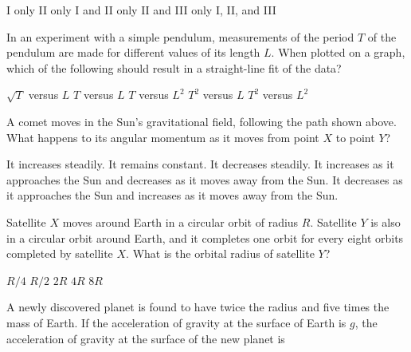 \documentclass[12pt]{../../oss-classkick-exam}
\begin{document}
\begin{questions}
  \begin{oneparchoices}
    \choice I only
    \choice II only
    \choice I and II only
    \choice II and III only
    \choice I, II, and III
  \end{oneparchoices}
  \vspace{.3in}
  
  \question In an experiment with a simple pendulum, measurements of the period
  $T$ of the pendulum are made for different values of its length $L$.
  When plotted on a graph, which of the following should result in a
  straight-line fit of the data?

  \begin{oneparchoices}
    \choice $\sqrt{T}$ versus $L$
    \choice $T$ versus $L$
    \choice $T$ versus $L^2$
    \choice $T^2$ versus $L$
    \choice $T^2$ versus $L^2$
  \end{oneparchoices}
  \vspace{.3in}
  \newpage
  
  \begin{center}
    \vspace{-.3in} 
  \end{center}
  \question A comet moves in the Sun's gravitational field, following the path
  shown above. What happens to its angular momentum as it moves from point $X$
  to point $Y$?
  \begin{choices}
    \choice It increases steadily.
    \choice It remains constant.
    \choice It decreases steadily.
    \choice It increases as it approaches the Sun and decreases as it moves
    away from the Sun.
    \choice It decreases as it approaches the Sun and increases as it moves
    away from the Sun.
  \end{choices}
  \vspace{.7in}

  \question Satellite $X$ moves around Earth in a circular orbit of radius $R$.
  Satellite $Y$ is also in a circular orbit around Earth, and it completes one
  orbit for every eight orbits completed by satellite $X$. What is the
  orbital radius of satellite $Y$?

  \begin{oneparchoices}
    \choice $R/4$
    \choice $R/2$
    \choice $2R$
    \choice $4R$
    \choice $8R$
  \end{oneparchoices}
  \vspace{.3in}
  
  \question A newly discovered planet is found to have twice the radius and five
  times the mass of Earth. If the acceleration of gravity at the surface of
  Earth is $g$, the acceleration of gravity at the surface of the new planet is


\end{questions}
\end{document}
